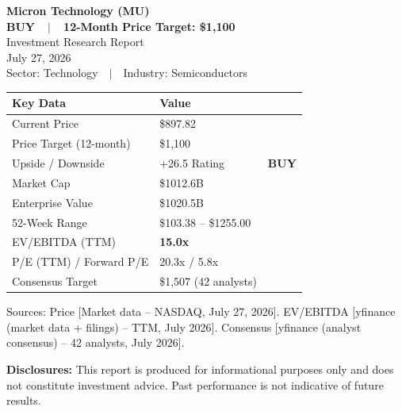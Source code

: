 \documentclass[11pt,a4paper]{report}
\begin{document}
\thispagestyle{empty}
\begin{center}
  \vspace*{2cm}
  {\Huge\bfseries\color{gsblue} Micron Technology (MU)}\\[10pt]
  {\Large\bfseries BUY~~$\vert$~~12-Month Price Target: \$1,100}\\[20pt]
  {\large Investment Research Report}\\[6pt]
  {\normalsize\color{darkgray} July 27, 2026}\\[4pt]
  {\normalsize\color{darkgray} Sector: Technology~~$\vert$~~Industry: Semiconductors}\\[30pt]
  
  \hrulefill
  \vspace{15pt}
  
  \begin{tabularx}{\textwidth}{lX}
    \toprule
    \textbf{Key Data} & \textbf{Value} \\
    \midrule
    Current Price & \$897.82 \\
    Price Target (12-month) & \$1,100 \\
    Upside / Downside & +26.5%
    Rating & \textbf{BUY} \\
    Market Cap & \$1012.6B \\
    Enterprise Value & \$1020.5B \\
    52-Week Range & \$103.38 -- \$1255.00 \\
     EV/EBITDA (TTM) & \textbf{15.0x} \\
    P/E (TTM) / Forward P/E & 20.3x / 5.8x \\
    Consensus Target & \$1,507 (42 analysts) \\
    \bottomrule
  \end{tabularx}
  \vspace{5pt}
  {\footnotesize\color{darkgray} Sources: Price [Market data -- NASDAQ, July 27, 2026]. EV/EBITDA [yfinance (market data + filings) -- TTM, July 2026]. Consensus [yfinance (analyst consensus) -- 42 analysts, July 2026].}
  
  \vspace{20pt}
  \hrulefill
  \vspace{10pt}
  {\small\color{darkgray} \textbf{Disclosures:} This report is produced for informational purposes only and does not constitute investment advice. Past performance is not indicative of future results.}
\end{center}
\end{document}
